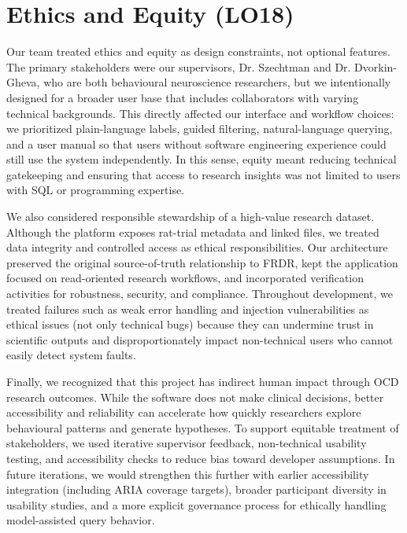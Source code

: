 \documentclass{article}
\begin{document}
\section{Ethics and Equity (LO18)}

\par{Our team treated ethics and equity as design constraints, not optional features. The primary stakeholders were our supervisors, Dr. Szechtman and Dr. Dvorkin-Gheva, who are both behavioural neuroscience researchers, but we intentionally designed for a broader user base that includes collaborators with varying technical backgrounds. This directly affected our interface and workflow choices: we prioritized plain-language labels, guided filtering, natural-language querying, and a user manual so that users without software engineering experience could still use the system independently. In this sense, equity meant reducing technical gatekeeping and ensuring that access to research insights was not limited to users with SQL or programming expertise.}

\par{We also considered responsible stewardship of a high-value research dataset. Although the platform exposes rat-trial metadata and linked files, we treated data integrity and controlled access as ethical responsibilities. Our architecture preserved the original source-of-truth relationship to FRDR, kept the application focused on read-oriented research workflows, and incorporated verification activities for robustness, security, and compliance. Throughout development, we treated failures such as weak error handling and injection vulnerabilities as ethical issues (not only technical bugs) because they can undermine trust in scientific outputs and disproportionately impact non-technical users who cannot easily detect system faults.}

\par{Finally, we recognized that this project has indirect human impact through OCD research outcomes. While the software does not make clinical decisions, better accessibility and reliability can accelerate how quickly researchers explore behavioural patterns and generate hypotheses. To support equitable treatment of stakeholders, we used iterative supervisor feedback, non-technical usability testing, and accessibility checks to reduce bias toward developer assumptions. In future iterations, we would strengthen this further with earlier accessibility integration (including ARIA coverage targets), broader participant diversity in usability studies, and a more explicit governance process for ethically handling model-assisted query behavior.}
\end{document}
